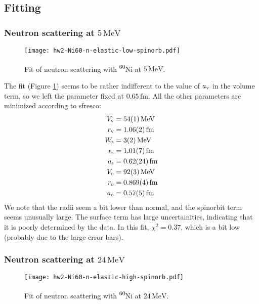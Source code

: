 \documentclass[fleqn, 12pt]{article}
\begin{document}
\subsection*{Fitting}

\subsubsection*{Neutron scattering at $5\,\mathrm{MeV}$}

\begin{figure}
  \centering
  \texttt{[image: hw2-Ni60-n-elastic-low-spinorb.pdf]}
  \caption{Fit of neutron scattering with \textsuperscript{60}Ni at
    $5\,\mathrm{MeV}$.}
  \label{fig:n-low-spinorb}
\end{figure}

The fit (Figure \ref{fig:n-low-spinorb}) seems to be rather indifferent to
the value of $a_{\text v}$ in the volume term, so we left the parameter fixed
at $0.65\,\mathrm{fm}$.  All the other parameters are minimized according to
sfresco:
\begin{align*}
  V_{\text v} &=    54(1)\,\mathrm{MeV} \\
  r_{\text v} &=  1.06(2)\,\mathrm{fm} \\
  W_{\text s} &=     3(2)\,\mathrm{MeV} \\
  r_{\text s} &=  1.01(7)\,\mathrm{fm} \\
  a_{\text s} &= 0.62(24)\,\mathrm{fm} \\
  V_{\text o} &=    92(3)\,\mathrm{MeV} \\
  r_{\text o} &= 0.869(4)\,\mathrm{fm} \\
  a_{\text o} &=  0.57(5)\,\mathrm{fm}
\end{align*}
We note that the radii seem a bit lower than normal, and the spinorbit term
seems unusually large.  The surface term has large uncertainities, indicating
that it is poorly determined by the data.  In this fit, $\chi^2 = 0.37$, which
is a bit low (probably due to the large error bars).

\subsubsection*{Neutron scattering at $24\,\mathrm{MeV}$}

\begin{figure}
  \centering
  \texttt{[image: hw2-Ni60-n-elastic-high-spinorb.pdf]}
  \caption{Fit of neutron scattering with \textsuperscript{60}Ni at
    $24\,\mathrm{MeV}$.}
  \label{fig:n-high-spinorb}
\end{figure}
\end{document}
